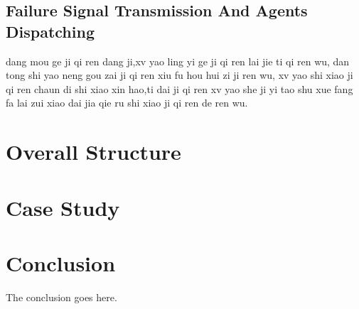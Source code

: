 \documentclass[journal]{IEEEtran}
\begin{document}
\subsection{Failure Signal Transmission And Agents Dispatching}
dang mou ge ji qi ren dang ji,xv yao ling yi ge ji qi ren lai jie ti qi ren wu, dan tong shi yao neng gou zai ji qi ren xiu fu hou hui zi ji ren wu, xv yao shi xiao ji qi ren chaun di shi xiao xin hao,ti dai ji qi ren xv yao she ji yi tao shu xue fang fa lai zui xiao dai jia qie ru shi xiao ji qi ren de ren wu.
\section{Overall Structure}

\section{Case Study}

\section{Conclusion}
The conclusion goes here.






%
\end{document}
